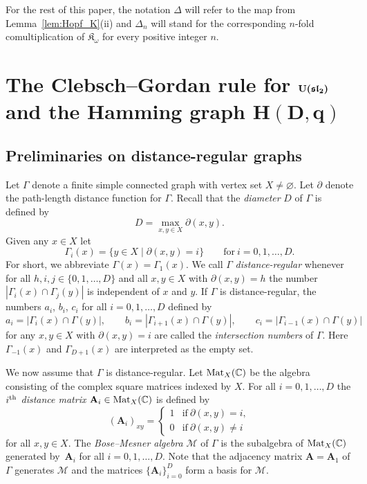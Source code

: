 \documentclass[pdftex]{sigma}%
\def\A{\mathbf A}
\def\C{\mathbb C}
\def\K{\mathfrak K_\omega}
\def\Mat{{\rm Mat}}
\def\M{\mathcal M}
\def\U{{\rm U}(\mathfrak{sl}_2)}
\numberwithin{equation}{section}
\begin{document}
For the rest of this paper, the notation $\Delta$ will refer to the map from Lemma~\ref{lem:Hopf_K}(ii) and $\Delta_n$ will stand for the corresponding $n$-fold comultiplication of $\K$ for every positive integer $n$.

\section[The Clebsch--Gordan rule for U(sl\_2) and the Hamming graph H(D,q)]{The Clebsch--Gordan rule for $\boldsymbol{\U}$\\ and the Hamming graph $\boldsymbol{H(D,q)}$}\label{s:Hamming}

\subsection{Preliminaries on distance-regular graphs}%

Let $\Gamma$ denote a finite simple connected graph with vertex set $X\not=\varnothing$. Let $\partial$ denote the path-length distance function for $\Gamma$. Recall that the {\it diameter} $D$ of $\Gamma$ is defined by
\[
D=\max_{x,y\in X}\partial(x,y).
\]
Given any $x\in X$ let
\[
\Gamma_i(x)=\{y\in X\mid \partial(x,y)=i\}\qquad
\text{for}\ i=0,1,\dots,D.
\]
For short, we abbreviate $\Gamma(x)=\Gamma_1(x)$. We call $\Gamma$ {\it distance-regular} whenever for all $h,i,j\in\{0,1,\dots,D\}$ and all $x,y\in X$ with $\partial(x,y)=h$ the number
$|\Gamma_i(x)\cap \Gamma_j(y)|$
is independent of $x$ and $y$. If $\Gamma$ is distance-regular, the numbers $a_i$, $b_i$, $c_i$ for all $i=0,1,\dots,D$ defined by
\[
a_i = |\Gamma_i(x) \cap \Gamma(y)|,\qquad
b_i = |\Gamma_{i+1}(x) \cap \Gamma(y)|,\qquad
c_i = |\Gamma_{i-1}(x) \cap \Gamma(y)|
\]
for any $x,y\in X$ with $\partial(x,y)=i$ are called the {\it intersection numbers} of $\Gamma$. Here $\Gamma_{-1}(x)$ and $\Gamma_{D+1}(x)$ are interpreted as the empty set.

We now assume that $\Gamma$ is distance-regular.
Let $\Mat_X(\C)$ be the algebra consisting of the complex square matrices indexed by $X$.
For all $i=0,1,\dots,D$ the {\it $i^{\rm th}$ distance matrix} $\A_i\in \Mat_X(\C)$ is defined by
\[
(\A_i)_{xy}
=
\begin{cases}
1
&\text{if}\ \partial(x,y)=i,
\\
0
&\text{if}\ \partial(x,y)\not=i
\end{cases}
\]
for all $x,y\in X$. The {\it Bose--Mesner algebra} $\M$ of $\Gamma$ is the subalgebra of $\Mat_X(\C)$ generated by~$\A_i$ for all $i=0,1,\dots,D$. Note that the adjacency matrix $\A=\A_1$ of $\Gamma$ generates $\M$ and the matrices $\{\A_i\}_{i=0}^D$ form a basis for $\M$.
\end{document}
